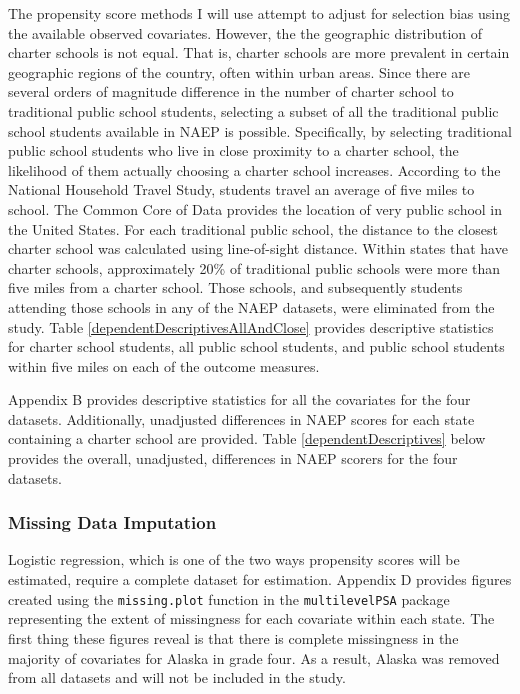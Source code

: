 \documentclass[letterpaper,12p,twoside]{article} %
\begin{document}
The propensity score methods I will use attempt to adjust for selection bias using the available observed covariates. However, the the geographic distribution of charter schools is not equal. That is, charter schools are more prevalent in certain geographic regions of the country, often within urban areas. Since there are several orders of magnitude difference in the number of charter school to traditional public school students, selecting a subset of all the traditional public school students available in NAEP is possible. Specifically, by selecting traditional public school students who live in close proximity to a charter school, the likelihood of them actually choosing a charter school increases. According to the National Household Travel Study, students travel an average of five miles to school. The Common Core of Data \cite{ccd} provides the location of very public school in the United States. For each traditional public school, the distance to the closest charter school was calculated using line-of-sight distance. Within states that have charter schools, approximately 20\% of traditional public schools were more than five miles from a charter school. Those schools, and subsequently students attending those schools in any of the NAEP datasets, were eliminated from the study. Table \ref{dependentDescriptivesAllAndClose} provides descriptive statistics for charter school students, all public school students, and public school students within five miles on each of the outcome measures.



Appendix B provides descriptive statistics for all the covariates for the four datasets. Additionally, unadjusted differences in NAEP scores for each state containing a charter school are provided. Table \ref{dependentDescriptives} below provides the overall, unadjusted, differences in NAEP scorers for the four datasets.



\subsubsection{Missing Data Imputation}
Logistic regression, which is one of the two ways propensity scores will be estimated, require a complete dataset for estimation. Appendix D provides figures created using the \texttt{missing.plot} function in the \texttt{multilevelPSA} package representing the extent of missingness for each covariate within each state. The first thing these figures reveal is that there is complete missingness in the majority of covariates for Alaska in grade four. As a result, Alaska was removed from all datasets and will not be included in the study. 
\end{document}
